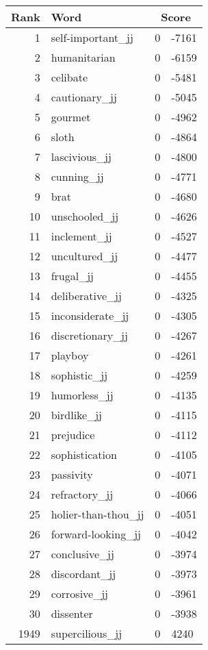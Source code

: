 \begin{longtable}[!htbp]{| rlr@{.}l |}
    \hline
    \textbf{Rank} & \textbf{Word} & \multicolumn{2}{c|}{\textbf{Score}} \\
    \hline
    \endhead
    1 & self-important\_jj & 0 & -7161 \\
    2 & humanitarian & 0 & -6159 \\
    3 & celibate & 0 & -5481 \\
    4 & cautionary\_jj & 0 & -5045 \\
    5 & gourmet & 0 & -4962 \\
    6 & sloth & 0 & -4864 \\
    7 & lascivious\_jj & 0 & -4800 \\
    8 & cunning\_jj & 0 & -4771 \\
    9 & brat & 0 & -4680 \\
    10 & unschooled\_jj & 0 & -4626 \\
    11 & inclement\_jj & 0 & -4527 \\
    12 & uncultured\_jj & 0 & -4477 \\
    13 & frugal\_jj & 0 & -4455 \\
    14 & deliberative\_jj & 0 & -4325 \\
    15 & inconsiderate\_jj & 0 & -4305 \\
    16 & discretionary\_jj & 0 & -4267 \\
    17 & playboy & 0 & -4261 \\
    18 & sophistic\_jj & 0 & -4259 \\
    19 & humorless\_jj & 0 & -4135 \\
    20 & birdlike\_jj & 0 & -4115 \\
    21 & prejudice & 0 & -4112 \\
    22 & sophistication & 0 & -4105 \\
    23 & passivity & 0 & -4071 \\
    24 & refractory\_jj & 0 & -4066 \\
    25 & holier-than-thou\_jj & 0 & -4051 \\
    26 & forward-looking\_jj & 0 & -4042 \\
    27 & conclusive\_jj & 0 & -3974 \\
    28 & discordant\_jj & 0 & -3973 \\
    29 & corrosive\_jj & 0 & -3961 \\
    30 & dissenter & 0 & -3938 \\
    1949 & supercilious\_jj & 0 & 4240 \\

\end{longtable}
